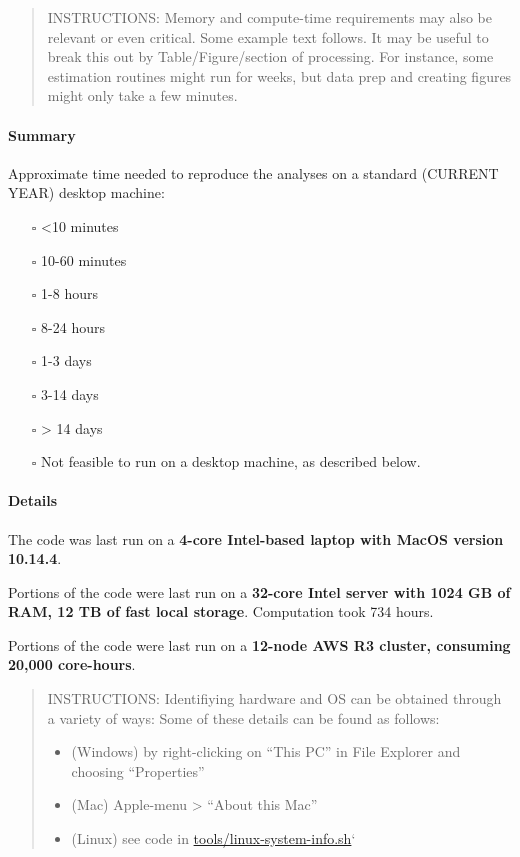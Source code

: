 \documentclass[
]{article}
\providecommand{\tightlist}{%
  \setlength{\itemsep}{0pt}\setlength{\parskip}{0pt}}
\begin{document}
\begin{quote}
INSTRUCTIONS: Memory and compute-time requirements may also be relevant
or even critical. Some example text follows. It may be useful to break
this out by Table/Figure/section of processing. For instance, some
estimation routines might run for weeks, but data prep and creating
figures might only take a few minutes.
\end{quote}

\hypertarget{summary}{%
\paragraph{Summary}\label{summary}}

Approximate time needed to reproduce the analyses on a standard (CURRENT
YEAR) desktop machine:

\begin{itemize}
\tightlist
\item[$\square$]
  \textless10 minutes
\item[$\square$]
  10-60 minutes
\item[$\square$]
  1-8 hours
\item[$\square$]
  8-24 hours
\item[$\square$]
  1-3 days
\item[$\square$]
  3-14 days
\item[$\square$]
  \textgreater{} 14 days
\item[$\square$]
  Not feasible to run on a desktop machine, as described below.
\end{itemize}

\hypertarget{details}{%
\paragraph{Details}\label{details}}

The code was last run on a \textbf{4-core Intel-based laptop with MacOS
version 10.14.4}.

Portions of the code were last run on a \textbf{32-core Intel server
with 1024 GB of RAM, 12 TB of fast local storage}. Computation took 734
hours.

Portions of the code were last run on a \textbf{12-node AWS R3 cluster,
consuming 20,000 core-hours}.

\begin{quote}
INSTRUCTIONS: Identifiying hardware and OS can be obtained through a
variety of ways: Some of these details can be found as follows:

\begin{itemize}
\tightlist
\item
  (Windows) by right-clicking on ``This PC'' in File Explorer and
  choosing ``Properties''
\item
  (Mac) Apple-menu \textgreater{} ``About this Mac''
\item
  (Linux) see code in
  \href{https://github.com/AEADataEditor/replication-template/blob/master/tools/linux-system-info.sh}{tools/linux-system-info.sh}`
\end{itemize}
\end{quote}
\end{document}
